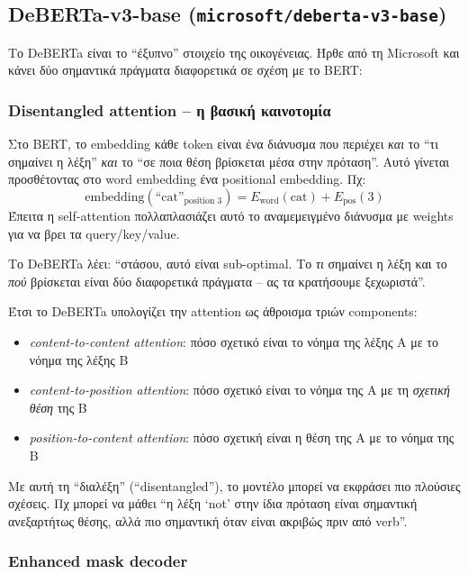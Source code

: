 \documentclass[12pt]{fphw}
\begin{document}
\subsection{DeBERTa-v3-base (\texttt{microsoft/deberta-v3-base})}

Το DeBERTa \cite{he2021deberta} είναι το ``έξυπνο'' στοιχείο της οικογένειας. Ήρθε από τη Microsoft και κάνει δύο σημαντικά πράγματα διαφορετικά σε σχέση με το BERT:

\subsubsection{Disentangled attention -- η βασική καινοτομία}

Στο BERT, το embedding κάθε token είναι ένα διάνυσμα που περιέχει \emph{και} το ``τι σημαίνει η λέξη'' \emph{και} το ``σε ποια θέση βρίσκεται μέσα στην πρόταση''. Αυτό γίνεται προσθέτοντας στο word embedding ένα positional embedding. Πχ:
\[
\text{embedding}(\text{``cat''}_{\text{position 3}}) = E_{\text{word}}(\text{cat}) + E_{\text{pos}}(3)
\]
Έπειτα η self-attention πολλαπλασιάζει αυτό το αναμεμειγμένο διάνυσμα με weights για να βρει τα query/key/value.

Το DeBERTa λέει: ``στάσου, αυτό είναι sub-optimal. Το \emph{τι} σημαίνει η λέξη και το \emph{πού} βρίσκεται είναι δύο διαφορετικά πράγματα -- ας τα κρατήσουμε ξεχωριστά''.

Έτσι το DeBERTa υπολογίζει την attention ως άθροισμα τριών components:
\begin{itemize}
    \item \emph{content-to-content attention}: πόσο σχετικό είναι το νόημα της λέξης A με το νόημα της λέξης B
    \item \emph{content-to-position attention}: πόσο σχετικό είναι το νόημα της A με τη \emph{σχετική θέση} της B
    \item \emph{position-to-content attention}: πόσο σχετική είναι η θέση της A με το νόημα της B
\end{itemize}

Με αυτή τη ``διαλέξη'' (``disentangled''), το μοντέλο μπορεί να εκφράσει πιο πλούσιες σχέσεις. Πχ μπορεί να μάθει ``η λέξη ‘not' στην ίδια πρόταση είναι σημαντική ανεξαρτήτως θέσης, αλλά πιο σημαντική όταν είναι ακριβώς πριν από verb''.

\subsubsection{Enhanced mask decoder}
\end{document}
